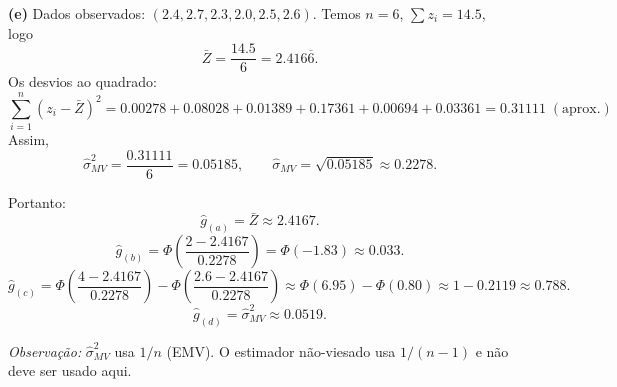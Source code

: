 \bigskip
\textbf{(e) } Dados observados: $(2.4, 2.7, 2.3, 2.0, 2.5, 2.6)$.
Temos $n=6$, $\sum z_i=14.5$, logo
\[
\bar Z=\frac{14.5}{6}=2.416\overline{6}.
\]
Os desvios ao quadrado:
\[
\sum_{i=1}^n (z_i-\bar Z)^2
=0.00278+0.08028+0.01389+0.17361+0.00694+0.03361
=0.31111\;(\text{aprox.})
\]
Assim,
\[
\widehat\sigma^2_{MV}=\frac{0.31111}{6}=0.05185,\qquad
\widehat\sigma_{MV}=\sqrt{0.05185}\approx 0.2278.
\]

Portanto:
\[
\widehat g_{(a)}=\bar Z\approx 2.4167.
\]
\[
\widehat g_{(b)}=
\Phi\!\left(\frac{2-2.4167}{0.2278}\right)
=\Phi(-1.83)\approx 0.033.
\]
\[
\widehat g_{(c)}=
\Phi\!\left(\frac{4-2.4167}{0.2278}\right)-
\Phi\!\left(\frac{2.6-2.4167}{0.2278}\right)
\approx \Phi(6.95)-\Phi(0.80)
\approx 1-0.2119
\approx 0.788.
\]
\[
\widehat g_{(d)}=\widehat\sigma^2_{MV}\approx 0.0519.
\]

\medskip
\textit{Observação:} $\widehat\sigma^2_{MV}$ usa $1/n$ (EMV). O estimador não-viesado
usa $1/(n-1)$ e não deve ser usado aqui.